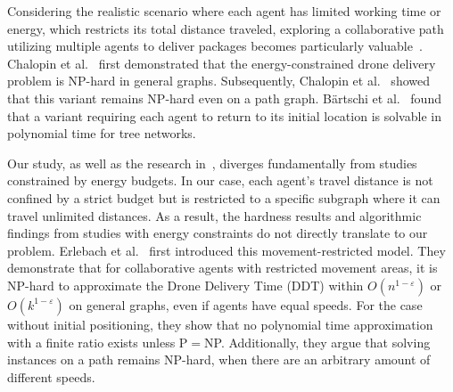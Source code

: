 Considering the realistic scenario where each agent has limited working time or energy, which restricts its total distance traveled, exploring a collaborative path utilizing multiple agents to deliver packages becomes particularly valuable~\cite{chalopin2014data,chalopin2014dataicalp,bartschi2020collaborative}.  Chalopin et al.~\cite{chalopin2014data} first demonstrated that the energy-constrained drone delivery problem is NP-hard in general graphs. Subsequently, Chalopin et al.~\cite{chalopin2014dataicalp} showed that this variant remains NP-hard even on a path graph. Bärtschi et al.~\cite{bartschi2020collaborative} found that a variant requiring each agent to return to its initial location is solvable in polynomial time for tree networks. 

Our study, as well as the research in~\cite{erlebach:drones}, diverges fundamentally from studies constrained by energy budgets. In our case, each agent's travel distance is not confined by a strict budget but is restricted to a specific subgraph where it can travel unlimited distances. As a result, the hardness results and algorithmic findings from studies with energy constraints do not directly translate to our problem. 
Erlebach et al.~\cite{erlebach:drones} first introduced this movement-restricted model. They demonstrate that for collaborative agents with restricted movement areas, it is NP-hard to approximate the Drone Delivery Time (DDT) within $O(n^{1-\varepsilon})$ or $O(k^{1-\varepsilon})$ 
 on general graphs, even if agents have equal speeds. 
For the case without initial positioning, they show that no polynomial time approximation with a finite ratio exists unless 
P$=$NP. Additionally, they argue that solving instances on a path remains NP-hard, when there are an arbitrary amount of different speeds. %





